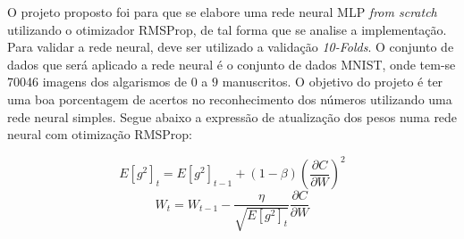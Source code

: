 O projeto proposto foi para que se elabore uma rede neural MLP \textit{from scratch} utilizando o otimizador RMSProp, de tal forma que se analise a implementação. Para validar a rede neural, deve ser utilizado a validação \textit{10-Folds}. O conjunto de dados que será aplicado a rede neural é o conjunto de dados MNIST, onde tem-se 70046 imagens dos algarismos de $0$ a $9$ manuscritos. O objetivo do projeto é ter uma boa porcentagem de acertos no reconhecimento dos números utilizando uma rede neural simples. Segue abaixo a expressão de atualização dos pesos numa rede neural com otimização RMSProp:

$$E[g^2]_t = E[g^2]_{t-1} + (1-\beta)\left(\frac{\partial {C}}{\partial {W}}\right)^2$$
$$W_t = W_{t-1} - \frac{\eta}{\sqrt{E[g^2]_t}}\frac{\partial {C}}{\partial {W}}$$